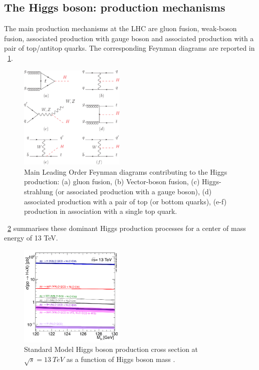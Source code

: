 \subsection{The Higgs boson: production mechanisms}
The main production mechanisms at the LHC are gluon fusion, weak-boson fusion, associated production with gauge boson and associated production with a pair of top/antitop quarks. 
The corresponding Feynman diagrams are reported in \figurename~\ref{Feynman_H_production}.
\begin{figure}[htbp]
\centering
\includegraphics[width=0.45\textwidth]{Images/Feynman_H_production}
\caption{Main Leading Order Feynman diagrams contributing to the Higgs production: (a) gluon fusion, (b) Vector-boson fusion, (c) Higgs-strahlung (or associated production with a gauge boson), (d) associated production with a pair of top (or bottom quarks), (e-f) production in association with a single top quark.}
\label{Feynman_H_production}
\end{figure}
\figurename~\ref{plot_13tev_H_production} summarises these dominant Higgs production processes for a center of mass energy of 13 TeV. \\
\begin{figure}[htbp]
\centering
\includegraphics[width=0.45\textwidth]{Images/plot_13tev_H_production}
\caption{Standard Model Higgs boson production cross section at $\sqrt{s} = 13\ TeV$ as a function of Higgs boson mass \cite{HiggsProduction}.}
\label{plot_13tev_H_production}
\end{figure}
